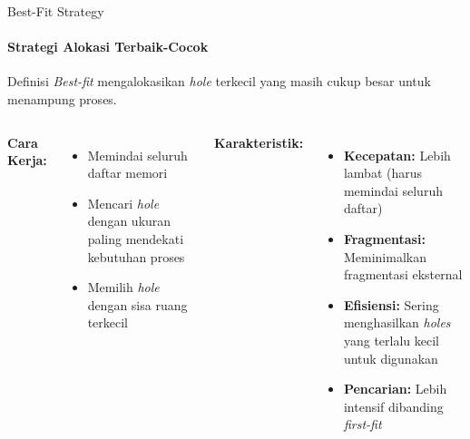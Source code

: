 \documentclass[10pt,aspectratio=169]{beamer}
\begin{document}
\begin{frame}{Best-Fit Strategy}
    \framesubtitle{Strategi Alokasi Terbaik-Cocok}
    
    \begin{block}{Definisi}
        \textit{Best-fit} mengalokasikan \textit{hole} terkecil yang masih cukup besar untuk menampung proses.
    \end{block}
    
    \begin{columns}[T]
            \textbf{Cara Kerja:}
            \begin{itemize}
                \item Memindai seluruh daftar memori
                \item Mencari \textit{hole} dengan ukuran paling mendekati kebutuhan proses
                \item Memilih \textit{hole} dengan sisa ruang terkecil
            \end{itemize}
            
            \textbf{Karakteristik:}
            \begin{itemize}
                \item \textbf{Kecepatan:} Lebih lambat (harus memindai seluruh daftar)
                \item \textbf{Fragmentasi:} Meminimalkan fragmentasi eksternal
                \item \textbf{Efisiensi:} Sering menghasilkan \textit{holes} yang terlalu kecil untuk digunakan
                \item \textbf{Pencarian:} Lebih intensif dibanding \textit{first-fit}
            \end{itemize}
    \end{columns}
\end{frame}
\end{document}
